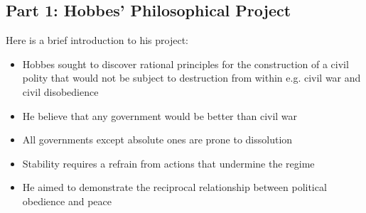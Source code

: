 \documentclass[12pt, letterpaper]{article}
\begin{document}
\subsection{Part 1: Hobbes' Philosophical Project}
Here is a brief introduction to his project:
\begin{itemize}
	\item Hobbes sought to discover rational principles for the construction of a civil polity that would not be subject to destruction from within e.g. civil war and civil disobedience
	\item He believe that any government would be better than civil war
	\item All governments except absolute ones are prone to dissolution
	\item Stability requires a refrain from actions that undermine the regime
	\item He aimed to demonstrate the reciprocal relationship between political obedience and peace
\end{itemize}
\end{document}
